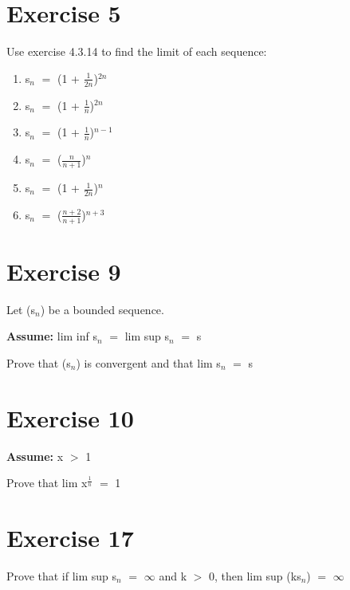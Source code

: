 \documentclass{article}
\newcommand{\mt}[1]{\ensuremath{#1}}
\newcommand\bsc[2][\DefaultOpt]{%
  \def\DefaultOpt{#2}%
  \section[#1]{#2}%
}
\newcommand{\balist}{\begin{enumerate}[label=\alph*.]}
\newcommand{\elist}{\end{enumerate}}
\newcommand{\as}[1]{\textbf{Assume: } #1}
\newcommand{\prn}[1]{(#1)}
\newcommand{\gr}{\mt{>} }
\newcommand{\eql}{\mt{=} }
\newcommand{\uw}[2]{#1\mt{_{#2}}}
\newcommand{\uf}[2]{#1\mt{^{#2}}}
\newcommand{\frc}[2]{\mt{\frac{#1}{#2}}}
\newcommand{\infy}{\mt{\infty} }
\begin{document}
\bsc{Exercise 5}{

Use exercise 4.3.14 to find the limit of each sequence:

\balist
\item \uw{s}{n} \eql (1 + \frc{1}{2n})$^{2n}$
\item \uw{s}{n} \eql (1 + \frc{1}{n})$^{2n}$
\item \uw{s}{n} \eql (1 + \frc{1}{n})$^{n - 1}$
\item \uw{s}{n} \eql (\frc{n	}{n + 1})$^{n}$
\item \uw{s}{n} \eql (1 + \frc{1	}{2n})$^{n}$
\item \uw{s}{n} \eql (\frc{n + 2	}{n + 1})$^{n + 3}$
\elist

}

\bsc{Exercise 9}{

Let \prn{\uw{s}{n}} be a bounded sequence.

\as{lim inf \uw{s}{n} \eql lim sup \uw{s}{n} \eql s}

Prove that \prn{\uw{s}{n}} is convergent and that lim \uw{s}{n} \eql s

}

\bsc{Exercise 10}{

\as{x \gr 1}

Prove that lim \uf{x}{\frc{1}{n}} \eql 1

}

\bsc{Exercise 17}{

Prove that if lim sup \uw{s}{n} \eql \infy and k \gr 0, then lim sup (k\uw{s}{n}) \eql \infy 

}
\end{document}
